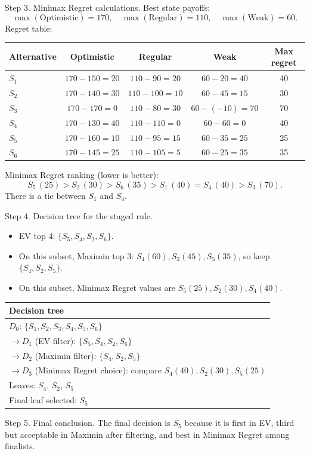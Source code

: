 \begin{ExamProblems}
		Step 3. Minimax Regret calculations.
		Best state payoffs:
		\[
		\max(\text{Optimistic})=170,\quad \max(\text{Regular})=110,\quad \max(\text{Weak})=60.
		\]
		Regret table:
		\begin{center}
			\begin{tabular}{l c c c c}
				\toprule
				Alternative & Optimistic & Regular & Weak & Max regret \\
				\midrule
				$S_1$ & $170-150=20$ & $110-90=20$ & $60-20=40$ & 40 \\
				$S_2$ & $170-140=30$ & $110-100=10$ & $60-45=15$ & 30 \\
				$S_3$ & $170-170=0$ & $110-80=30$ & $60-(-10)=70$ & 70 \\
				$S_4$ & $170-130=40$ & $110-110=0$ & $60-60=0$ & 40 \\
				$S_5$ & $170-160=10$ & $110-95=15$ & $60-35=25$ & 25 \\
				$S_6$ & $170-145=25$ & $110-105=5$ & $60-25=35$ & 35 \\
				\bottomrule
			\end{tabular}
		\end{center}
		Minimax Regret ranking (lower is better):
		\[
		S_5\,(25)>S_2\,(30)>S_6\,(35)>S_1\,(40)=S_4\,(40)>S_3\,(70).
		\]
		There is a tie between $S_1$ and $S_4$.

		Step 4. Decision tree for the staged rule.
		\begin{itemize}
			\item EV top 4: $\{S_5,S_4,S_2,S_6\}$.
			\item On this subset, Maximin top 3: $S_4(60),S_2(45),S_5(35)$, so keep $\{S_4,S_2,S_5\}$.
			\item On this subset, Minimax Regret values are $S_5(25),S_2(30),S_4(40)$.
		\end{itemize}
		\begin{center}
			\begin{tabular}{l}
				\toprule
				Decision tree \\
				\midrule
				$D_0$: $\{S_1,S_2,S_3,S_4,S_5,S_6\}$ \\
				$\rightarrow D_1$ (EV filter): $\{S_5,S_4,S_2,S_6\}$ \\
				$\rightarrow D_2$ (Maximin filter): $\{S_4,S_2,S_5\}$ \\
				$\rightarrow D_3$ (Minimax Regret choice): compare $S_4(40),S_2(30),S_5(25)$ \\
				Leaves: $S_4$, $S_2$, $S_5$ \\
				Final leaf selected: $S_5$ \\
				\bottomrule
			\end{tabular}
		\end{center}

		Step 5. Final conclusion.
		The final decision is $S_5$ because it is first in EV, third but acceptable in Maximin after filtering, and best in Minimax Regret among finalists.
	\end{ExamProblems}

